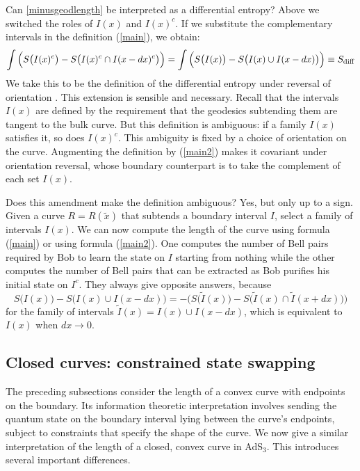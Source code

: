 \documentclass[12pt]{article}
\def\sdiff{S_{\rm diff}}
\begin{document}
Can \eqref{minusgeodlength} be interpreted as a differential entropy? Above we switched the roles of $I(x)$ and $I(x)^c$. If we substitute the complementary intervals in the definition (\ref{main}), we obtain:
\begin{equation}
\int \Big(S\big(I(x)^c\big) - S\big(I(x)^c \cap I(x-dx)^c\big) \Big) =
\int \Big(S\big(I(x)\big) - S\big(I(x) \cup I(x-dx)\big) \Big) \equiv \sdiff
\label{main2}
\end{equation}
We take this to be the definition of the differential entropy under reversal of orientation \cite{roblast, robproof, lampros}. This extension is sensible and necessary. Recall that the intervals $I(x)$ are defined by the requirement that the geodesics subtending them are tangent to the bulk curve. But this definition is ambiguous: if a family $I(x)$ satisfies it, so does $I(x)^c$. This ambiguity is fixed by a choice of orientation on the curve. Augmenting the definition by (\ref{main2}) makes it covariant under orientation reversal, whose boundary counterpart is to take the complement of each set $I(x)$.

Does this amendment make the definition ambiguous? Yes, but only up to a sign. Given a curve $R = R(\tilde{x})$ that subtends a boundary interval $I$, select a family of intervals $I(x)$. We can now compute the length of the curve using formula (\ref{main}) or using formula (\ref{main2}). One computes the number of Bell pairs required by Bob to learn the state on $I$ starting from nothing while the other computes the number of Bell pairs that can be extracted as Bob purifies his initial state on $I^c$. They always give opposite answers, because
\begin{equation}
S\big(I(x)\big) - S\big(I(x) \cup I(x-dx)\big) = - \Big( S\big(\tilde{I}(x)\big) - S\big( \tilde{I}(x) \cap \tilde{I}(x+dx) \big) \Big)
\label{sumdiff}
\end{equation}
for the family of intervals $\tilde{I}(x) = I(x) \cup I(x-dx)$, which is equivalent to $I(x)$ when $dx \to 0$.

\subsection{Closed curves: constrained state swapping}
\label{swapprotocol}
The preceding subsections consider the length of a convex curve with endpoints on the boundary. Its information theoretic interpretation involves sending the quantum state on the boundary interval lying between the curve's endpoints, subject to constraints that specify the shape of the curve. We now give a similar interpretation of the length of a closed, convex curve in AdS$_3$. This introduces several important differences.
\end{document}
